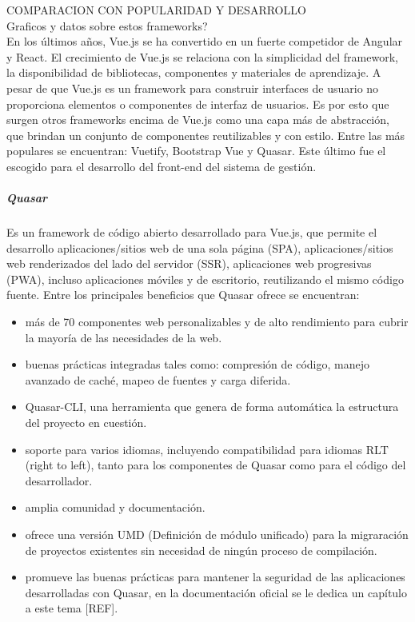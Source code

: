 COMPARACION CON POPULARIDAD Y DESARROLLO\\
Graficos y datos sobre estos frameworks?\\


En los últimos años, Vue.js se ha convertido
en un fuerte competidor de Angular y React. El 
crecimiento de Vue.js se relaciona con la simplicidad 
del framework, la disponibilidad de bibliotecas, componentes
y materiales de aprendizaje. A pesar de que Vue.js es 
un framework para construir interfaces de usuario no 
proporciona elementos o componentes de interfaz de usuarios. Es por esto que surgen  
otros frameworks encima de Vue.js como una capa más de abstracción, que 
brindan un conjunto de componentes reutilizables y con estilo. Entre 
las más populares se encuentran: Vuetify, Bootstrap Vue y Quasar.
Este último fue el escogido para el desarrollo del front-end del sistema de gestión. 
  



\subparagraph{Quasar}
Es un framework de código abierto desarrollado para Vue.js,
que permite el desarrollo aplicaciones/sitios web de una sola página (SPA),
aplicaciones/sitios web renderizados del lado del servidor (SSR),
aplicaciones web progresivas (PWA), incluso aplicaciones móviles y de 
escritorio, reutilizando el mismo código fuente. 
Entre los principales beneficios que Quasar ofrece 
se encuentran:

\begin{itemize}
    \item más de 70 componentes web personalizables y de alto rendimiento para cubrir la 
    mayoría de las necesidades de la web.
    \item buenas prácticas integradas tales como: compresión de código, 
    manejo avanzado de caché, mapeo de fuentes y carga diferida. 
    \item Quasar-CLI, una herramienta que genera de forma automática la estructura del 
    proyecto en cuestión.
    \item soporte para varios idiomas, incluyendo 
    compatibilidad para idiomas RLT (right to left), tanto para los componentes de Quasar
    como para el código del desarrollador.  
    \item amplia comunidad y documentación.
    \item ofrece una versión UMD (Definición de módulo unificado) para la migraración
    de proyectos existentes sin necesidad de ningún proceso de compilación.
    \item promueve las buenas prácticas para mantener la seguridad de las aplicaciones
    desarrolladas con Quasar, en la documentación oficial se le dedica un capítulo
    a este tema [REF].

\end{itemize}


